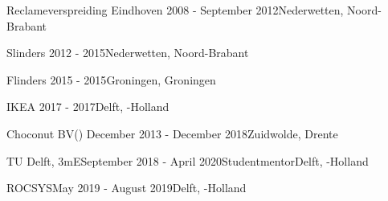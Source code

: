 \begin{rSection}{}

{%
  \begin{experienceItem}
    {Reclameverspreiding Eindhoven}{ 2008 - September 2012}{}{Nederwetten, Noord-Brabant}
\end{experienceItem}}{}

  \begin{experienceItem}
    {Slinders}{ 2012 -  2015}{{}}{Nederwetten, Noord-Brabant}
  \end{experienceItem}


{%
  \begin{experienceItem}
    {Flinders}{ 2015 -  2015}{}{Groningen, Groningen}
\end{experienceItem} 

  \begin{experienceItem}
    {IKEA}{ 2017 -  2017}{}{Delft, -Holland}
\end{experienceItem}}{}


{%
  \begin{experienceItem}
    {Choconut BV}{() December 2013 - December 2018}{}{Zuidwolde, Drente}
\end{experienceItem}}{}

  \begin{experienceItem}
    {TU Delft, 3mE}{September 2018 - April 2020}{Studentmentor}{Delft, -Holland}
  \end{experienceItem}

{%
  \begin{experienceItem}
    {ROCSYS}{May 2019 - August 2019}{}{Delft, -Holland}
\end{experienceItem}
}{}


\end{rSection}

